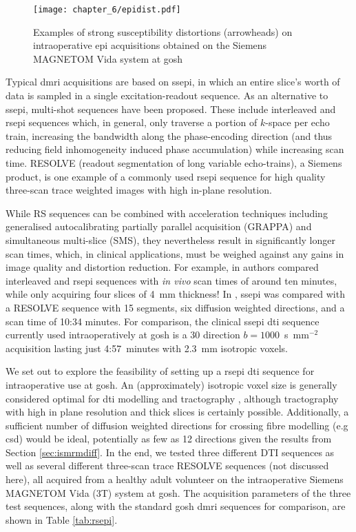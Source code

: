 \begin{figure}[h!]
  \texttt{[image: chapter\_6/epidist.pdf]}
  \caption{Examples of strong susceptibility distortions (arrowheads) on intraoperative \gls{epi} acquisitions obtained on the Siemens MAGNETOM Vida system at \gls{gosh}}
  \label{fig:epi}
\end{figure}

Typical \gls{dmri} acquisitions are based on \gls{ssepi}, in which an entire slice's worth of data is sampled in a single excitation-readout sequence.
As an alternative to \gls{ssepi}, multi-shot sequences have been proposed.
These include interleaved and \gls{rsepi} sequences which, in general, only traverse a portion of $k$-space per echo train, increasing the bandwidth along the phase-encoding direction (and thus reducing field inhomogeneity induced phase accumulation) while increasing scan time\autocite{Wang2018}.
RESOLVE (readout segmentation of long variable echo-trains), a Siemens product, is one example of a commonly used \gls{rsepi} sequence for high quality three-scan trace weighted images with high in-plane resolution.

While RS sequences can be combined with acceleration techniques including generalised autocalibrating partially parallel acquisition (GRAPPA) and simultaneous multi-slice (SMS), they nevertheless result in significantly longer scan times, which, in clinical applications, must be weighed against any gains in image quality and distortion reduction.
For example, in \textcite{Wang2018} authors compared interleaved and \gls{rsepi} sequences with \textit{in vivo} scan times of around ten minutes, while only acquiring four slices of 4~mm thickness!
In \textcite{Elliott2020}, \gls{ssepi} was compared with a RESOLVE sequence with 15 segments, six diffusion weighted directions, and a scan time of 10:34 minutes.
For comparison, the clinical \gls{ssepi} \gls{dti} sequence currently used intraoperatively at \gls{gosh} is a 30 direction $b=1000$~s~mm$^{-2}$ acquisition lasting just 4:57~minutes with 2.3~mm isotropic voxels.

We set out to explore the feasibility of setting up a \gls{rsepi} \gls{dti} sequence for intraoperative use at \gls{gosh}.
An (approximately) isotropic voxel size is generally considered optimal for \gls{dti} modelling and tractography \autocite{Vos2011, Neher2013}, although tractography with high in plane resolution and thick slices is certainly possible.
Additionally, a sufficient number of diffusion weighted directions for crossing fibre modelling (e.g \gls{csd}) would be ideal, potentially as few as 12 directions given the results from Section \ref{sec:ismrmdiff}.
In the end, we tested three different DTI sequences as well as several different three-scan trace RESOLVE sequences (not discussed here), all acquired from a healthy adult volunteer on the intraoperative Siemens MAGNETOM Vida (3T) system at \gls{gosh}.
The acquisition parameters of the three test sequences, along with the standard \gls{gosh} \gls{dmri} sequences for comparison, are shown in Table \ref{tab:rsepi}.


